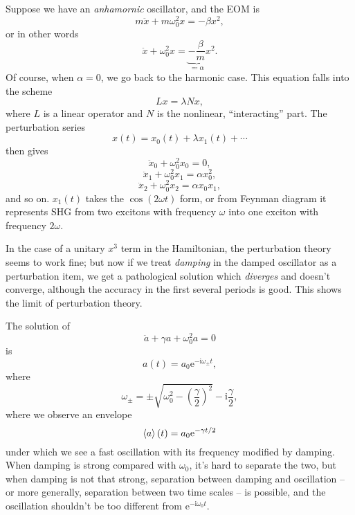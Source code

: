 \documentclass[hyperref, a4paper]{article}
\newcommand*{\ii}{\mathrm{i}}
\newcommand*{\ee}{\mathrm{e}}
\begin{document}
Suppose we have an \emph{anhamornic} oscillator, 
and the EOM is 
\begin{equation}
    m \ddot{x} + m \omega_0^2 x = - \beta x^2,
\end{equation}
or in other words 
\begin{equation}
    \ddot{x} + \omega_0^2 x = \underbrace{
        - \frac{\beta}{m}
    }_{\eqqcolon \alpha} x^2.
\end{equation}
Of course, when $\alpha = 0$, we go back to the harmonic case.
This equation falls into the scheme 
\begin{equation}
    L x = \lambda N x,
\end{equation}
where $L$ is a linear operator 
and $N$ is the nonlinear, ``interacting'' part.
The perturbation series
\begin{equation}
    x(t) = x_0(t) + \lambda x_1(t) + \cdots 
\end{equation} 
then gives 
\begin{equation}
    \ddot{x}_0 + \omega_0^2 x_0 = 0,
\end{equation}
\begin{equation}
    \ddot{x}_1 + \omega_0^2 x_1 = \alpha x_0^2, 
\end{equation}
\begin{equation}
    \ddot{x}_2 + \omega_0^2 x_2 = \alpha x_0 x_1, 
\end{equation}
and so on. $x_1(t)$ takes the $\cos (2 \omega t)$ form,
or from Feynman diagram it represents SHG from two excitons with frequency $\omega$ 
into one exciton with frequency $2 \omega$.

In the case of a unitary $x^3$ term in the Hamiltonian,
the perturbation theory seems to work fine; 
but now if we treat \emph{damping} in the damped oscillator as a perturbation item,
we get a pathological solution 
which \emph{diverges} and doesn't converge,
although the accuracy in the first several periods is good.
This shows the limit of perturbation theory.

The solution of 
\begin{equation}
    \ddot{a} + \gamma a + \omega_0^2 a = 0 
\end{equation}
is 
\begin{equation}
    a(t) = a_0 \ee^{- \ii \omega_\pm t} ,
\end{equation}
where 
\begin{equation}
    \omega_\pm = \pm \sqrt{
        \omega_0^2 - \left(\frac{\gamma}{2}\right)^2
    } - \ii \frac{\gamma}{2},
\end{equation}
where we observe an envelope 
\begin{equation}
    \expval{a}(t) = a_0 \ee^{- \gamma t / 2}
\end{equation}
under which we see a fast oscillation
with its frequency modified by damping.
When damping is strong compared with $\omega_0$,
it's hard to separate the two, 
but when damping is not that strong, 
separation between damping and oscillation -- 
or more generally, separation between two time scales -- is possible,
and the oscillation shouldn't be too different from $\ee^{- \ii \omega_0 t}$.
\end{document}
